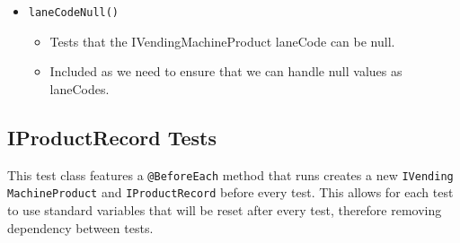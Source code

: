 \documentclass{article}
\begin{document}
\begin{itemize}
\item \verb+laneCodeNull()+
\begin{itemize}
\item Tests that the IVendingMachineProduct laneCode can be null.
\item Included as we need to ensure that we can handle null values as laneCodes.
\end{itemize}
\end{itemize}





\subsection{IProductRecord Tests}
This test class features a \verb+@BeforeEach+ method that runs creates a new \verb+IVending+ \verb+MachineProduct+ and \verb+IProductRecord+ before every test. This allows for each test to use standard variables that will be reset after every test, therefore removing dependency between tests.
\end{document}
